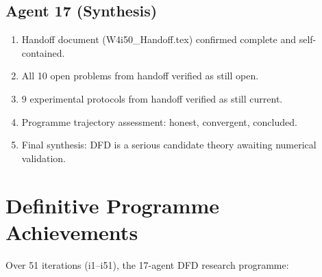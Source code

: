 \documentclass[11pt,a4paper]{article}
\begin{document}
\subsection{Agent 17 (Synthesis)}
\begin{enumerate}
\item Handoff document (W4i50\_Handoff.tex) confirmed complete and self-contained.
\item All 10 open problems from handoff verified as still open.
\item 9 experimental protocols from handoff verified as still current.
\item Programme trajectory assessment: honest, convergent, concluded.
\item Final synthesis: DFD is a serious candidate theory awaiting numerical validation.
\end{enumerate}


\section{Definitive Programme Achievements}

Over 51 iterations (i1--i51), the 17-agent DFD research programme:
\end{document}
